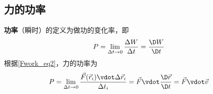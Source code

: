 \subsection{力的功率}
\textbf{功率}（瞬时）的定义为做功的变化率，即
\begin{equation}
P = \lim_{\Delta t\to 0} \frac{\Delta W}{\Delta t} = \frac{\D W}{\D t}
\end{equation}
根据\autoref{Fwork_eq2}，力的功率为
\begin{equation}
P = \lim_{\Delta t\to 0} \frac{\vec F(\vec r_i)\vdot\Delta\vec r_i}{\Delta t_i} = \vec F \vdot\frac{\D\vec r}{\D t} = \vec F\vdot\vec v
\end{equation}






